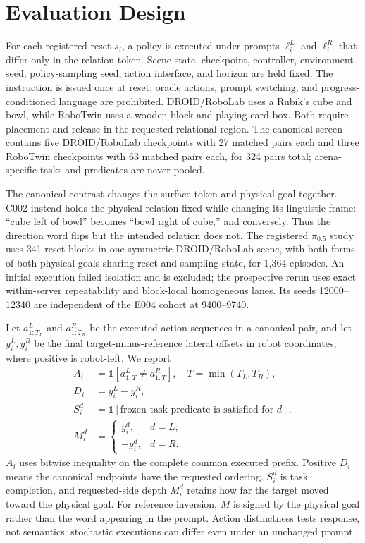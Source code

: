\section{Evaluation Design}
\label{sec:method}

For each registered reset $s_i$, a policy is executed under prompts $\ell_i^L$ and $\ell_i^R$ that differ only in the relation token. Scene state, checkpoint, controller, environment seed, policy-sampling seed, action interface, and horizon are held fixed. The instruction is issued once at reset; oracle actions, prompt switching, and progress-conditioned language are prohibited. DROID/RoboLab uses a Rubik's cube and bowl, while RoboTwin uses a wooden block and playing-card box. Both require placement and release in the requested relational region. The canonical screen contains five DROID/RoboLab checkpoints with 27 matched pairs each and three RoboTwin checkpoints with 63 matched pairs each, for 324 pairs total; arena-specific tasks and predicates are never pooled.

The canonical contrast changes the surface token and physical goal together. C002 instead holds the physical relation fixed while changing its linguistic frame: ``cube left of bowl'' becomes ``bowl right of cube,'' and conversely. Thus the direction word flips but the intended relation does not. The registered $\pi_{0.5}$ study uses 341 reset blocks in one symmetric DROID/RoboLab scene, with both forms of both physical goals sharing reset and sampling state, for 1,364 episodes. An initial execution failed isolation and is excluded; the prospective rerun uses exact within-server repeatability and block-local homogeneous lanes. Its seeds 12000--12340 are independent of the E004 cohort at 9400--9740.

Let $a^L_{1:T_L}$ and $a^R_{1:T_R}$ be the executed action sequences in a canonical pair, and let $y_i^L,y_i^R$ be the final target-minus-reference lateral offsets in robot coordinates, where positive is robot-left. We report
\begin{align}
A_i &= \mathbb{1}\!\left[a^L_{1:T}\neq a^R_{1:T}\right], \quad T=\min(T_L,T_R), \\
D_i &= y_i^L-y_i^R, \\
S_i^d &= \mathbb{1}[\text{frozen task predicate is satisfied for }d], \\
M_i^d &= \begin{cases}y_i^d,&d=L,\\-y_i^d,&d=R.\end{cases}
\end{align}
$A_i$ uses bitwise inequality on the complete common executed prefix. Positive $D_i$ means the canonical endpoints have the requested ordering. $S_i^d$ is task completion, and requested-side depth $M_i^d$ retains how far the target moved toward the physical goal. For reference inversion, $M$ is signed by the physical goal rather than the word appearing in the prompt. Action distinctness tests response, not semantics: stochastic executions can differ even under an unchanged prompt.

